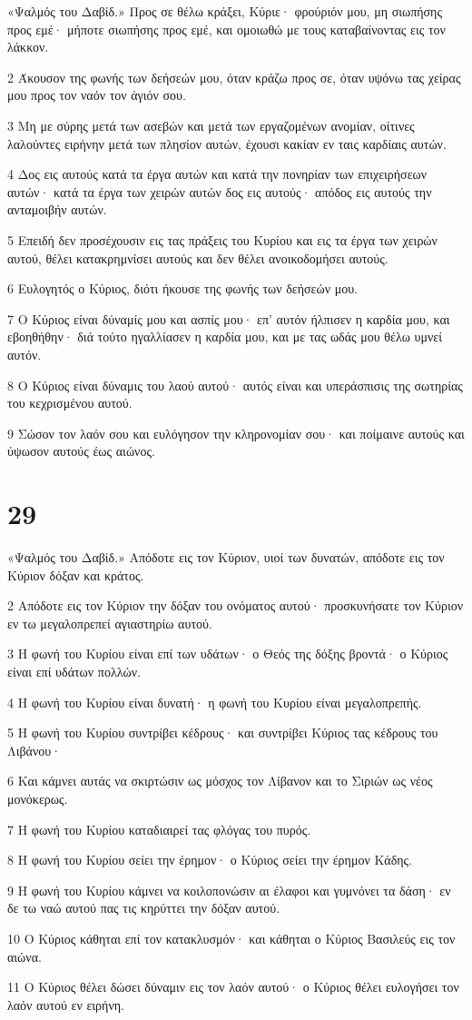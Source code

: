 \par «Ψαλμός του Δαβίδ.» Προς σε θέλω κράξει, Κύριε· φρούριόν μου, μη σιωπήσης προς εμέ· μήποτε σιωπήσης προς εμέ, και ομοιωθώ με τους καταβαίνοντας εις τον λάκκον.
\par 2 Άκουσον της φωνής των δεήσεών μου, όταν κράζω προς σε, όταν υψόνω τας χείρας μου προς τον ναόν τον άγιόν σου.
\par 3 Μη με σύρης μετά των ασεβών και μετά των εργαζομένων ανομίαν, οίτινες λαλούντες ειρήνην μετά των πλησίον αυτών, έχουσι κακίαν εν ταις καρδίαις αυτών.
\par 4 Δος εις αυτούς κατά τα έργα αυτών και κατά την πονηρίαν των επιχειρήσεων αυτών· κατά τα έργα των χειρών αυτών δος εις αυτούς· απόδος εις αυτούς την ανταμοιβήν αυτών.
\par 5 Επειδή δεν προσέχουσιν εις τας πράξεις του Κυρίου και εις τα έργα των χειρών αυτού, θέλει κατακρημνίσει αυτούς και δεν θέλει ανοικοδομήσει αυτούς.
\par 6 Ευλογητός ο Κύριος, διότι ήκουσε της φωνής των δεήσεών μου.
\par 7 Ο Κύριος είναι δύναμίς μου και ασπίς μου· επ' αυτόν ήλπισεν η καρδία μου, και εβοηθήθην· διά τούτο ηγαλλίασεν η καρδία μου, και με τας ωδάς μου θέλω υμνεί αυτόν.
\par 8 Ο Κύριος είναι δύναμις του λαού αυτού· αυτός είναι και υπεράσπισις της σωτηρίας του κεχρισμένου αυτού.
\par 9 Σώσον τον λαόν σου και ευλόγησον την κληρονομίαν σου· και ποίμαινε αυτούς και ύψωσον αυτούς έως αιώνος.

\chapter{29}

\par «Ψαλμός του Δαβίδ.» Απόδοτε εις τον Κύριον, υιοί των δυνατών, απόδοτε εις τον Κύριον δόξαν και κράτος.
\par 2 Απόδοτε εις τον Κύριον την δόξαν του ονόματος αυτού· προσκυνήσατε τον Κύριον εν τω μεγαλοπρεπεί αγιαστηρίω αυτού.
\par 3 Η φωνή του Κυρίου είναι επί των υδάτων· ο Θεός της δόξης βροντά· ο Κύριος είναι επί υδάτων πολλών.
\par 4 Η φωνή του Κυρίου είναι δυνατή· η φωνή του Κυρίου είναι μεγαλοπρεπής.
\par 5 Η φωνή του Κυρίου συντρίβει κέδρους· και συντρίβει Κύριος τας κέδρους του Λιβάνου·
\par 6 Και κάμνει αυτάς να σκιρτώσιν ως μόσχος τον Λίβανον και το Σιριών ως νέος μονόκερως.
\par 7 Η φωνή του Κυρίου καταδιαιρεί τας φλόγας του πυρός.
\par 8 Η φωνή του Κυρίου σείει την έρημον· ο Κύριος σείει την έρημον Κάδης.
\par 9 Η φωνή του Κυρίου κάμνει να κοιλοπονώσιν αι έλαφοι και γυμνόνει τα δάση· εν δε τω ναώ αυτού πας τις κηρύττει την δόξαν αυτού.
\par 10 Ο Κύριος κάθηται επί τον κατακλυσμόν· και κάθηται ο Κύριος Βασιλεύς εις τον αιώνα.
\par 11 Ο Κύριος θέλει δώσει δύναμιν εις τον λαόν αυτού· ο Κύριος θέλει ευλογήσει τον λαόν αυτού εν ειρήνη.

